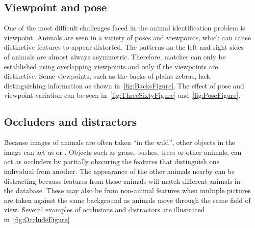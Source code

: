         \PlainsFigure{}

        \HardCaseFigure{}

        \GirMasaiFigure{}

        \GrevysFigure{}

        \HumpbackFig{}

    \FloatBarrier{}
    \subsection{Viewpoint and pose}
        One of the most difficult challenges faced in the animal identification problem is viewpoint. Animals are seen
        in a variety of poses and viewpoints, which can cause distinctive features to appear distorted. The patterns on
        the left and right sides of animals are almost always asymmetric. Therefore, matches can only be established
        using overlapping viewpoints and only if the viewpoints are distinctive. Some viewpoints, such as the backs of
        plains zebras, lack distinguishing information as shown in~\cref{fig:BacksFigure}. The effect of pose and
        viewpoint variation can be seen in~\cref{fig:ThreeSixtyFigure} and~\cref{fig:PoseFigure}.

        \BacksFigure{}

        \ThreeSixtyFigure{}

        \PoseFigure{}

    \FloatBarrier{}
    \subsection{Occluders and distractors}
        Because images of animals are often taken ``in the wild'', other objects in the image can act as
         or . Objects such as grass, bushes, trees or other animals, can act
        as occluders by partially obscuring the features that distinguish one individual from another. The appearance of
        the other animals nearby can be distracting because features from these animals will match different animals in
        the database. These  may also be from non-animal features when multiple pictures are
        taken against the same background as animals move through the same field of view. Several examples of occlusions
        and distractors are illustrated in~\cref{fig:OccludeFigure}

        \OccludeFigure{}

    \FloatBarrier{}
